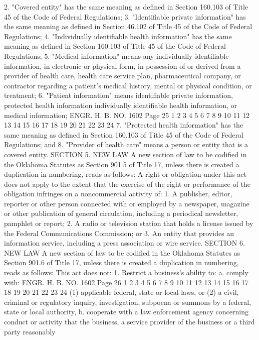 2. "Covered entity" has the same meaning as defined in Section
160.103 of Title 45 of the Code of Federal Regulations;
3. "Identifiable private information" has the same meaning as
defined in Section 46.102 of Title 45 of the Code of Federal
Regulations;
4. "Individually identifiable health information" has the same
meaning as defined in Section 160.103 of Title 45 of the Code of
Federal Regulations;
5. "Medical information" means any individually identifiable
information, in electronic or physical form, in possession of or
derived from a provider of health care, health care service plan,
pharmaceutical company, or contractor regarding a patient's medical
history, mental or physical condition, or treatment;
6. "Patient information" means identifiable private
information, protected health information individually identifiable
health information, or medical information;
ENGR. H. B. NO. 1602 Page 25
1
2
3
4
5
6
7
8
9
10
11
12
13
14
15
16
17
18
19
20
21
22
23
24
7. "Protected health information" has the same meaning as
defined in Section 160.103 of Title 45 of the Code of Federal
Regulations; and
8. "Provider of health care" means a person or entity that is a
covered entity.
SECTION 5. NEW LAW A new section of law to be codified
in the Oklahoma Statutes as Section 901.5 of Title 17, unless there
is created a duplication in numbering, reads as follows:
A right or obligation under this act does not apply to the
extent that the exercise of the right or performance of the
obligation infringes on a noncommercial activity of:
1. A publisher, editor, reporter or other person connected with
or employed by a newspaper, magazine or other publication of general
circulation, including a periodical newsletter, pamphlet or report;
2. A radio or television station that holds a license issued by
the Federal Communications Commission; or
3. An entity that provides an information service, including a
press association or wire service.
SECTION 6. NEW LAW A new section of law to be codified
in the Oklahoma Statutes as Section 901.6 of Title 17, unless there
is created a duplication in numbering, reads as follows:
This act does not:
1. Restrict a business's ability to:
a. comply with:
ENGR. H. B. NO. 1602 Page 26
1
2
3
4
5
6
7
8
9
10
11
12
13
14
15
16
17
18
19
20
21
22
23
24
(1) applicable federal, state or local laws, or
(2) a civil, criminal or regulatory inquiry,
investigation, subpoena or summons by a federal,
state or local authority,
b. cooperate with a law enforcement agency concerning
conduct or activity that the business, a service
provider of the business or a third party reasonably
